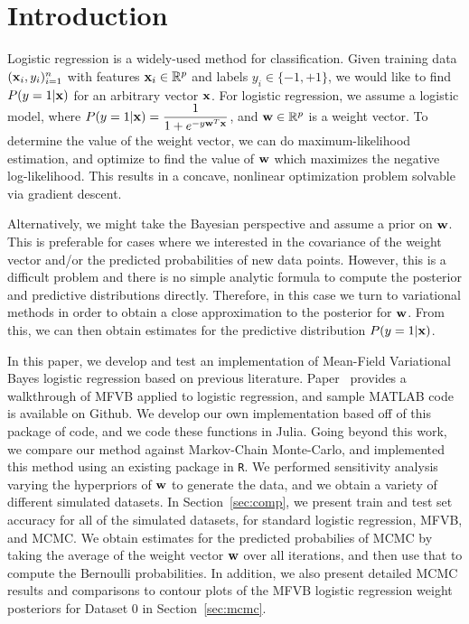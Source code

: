 
\section{Introduction}\label{sec:intro}

Logistic regression is a widely-used method for classification.  Given training data $(\boldsymbol{\mathbf{x}}_i, y_i)_{i=1}^n$ with features $\boldsymbol{\mathbf{x}}_i \in \mathbb{R}^p$ and labels $y_i \in \{-1,+1\}$, we would like to find $P(y = 1 | \boldsymbol{\mathbf{x}})$ for an arbitrary vector $\boldsymbol{\mathbf{x}}$.  For logistic regression, we assume a logistic model, where $P(y = 1 | \boldsymbol{\mathbf{x}}) = \dfrac{1}{1 + e^{-y\boldsymbol{\mathbf{w}}^T\boldsymbol{\mathbf{x}}}}$, and $\boldsymbol{\mathbf{w}} \in \mathbb{R}^p$ is a weight vector.  To determine the value of the weight vector, we can do maximum-likelihood estimation, and optimize to find the value of $\boldsymbol{\mathbf{w}}$ which maximizes the negative log-likelihood.  This results in a concave, nonlinear optimization problem solvable via gradient descent.

Alternatively, we might take the Bayesian perspective and assume a prior on $\boldsymbol{\mathbf{w}}$.  This is preferable for cases where we interested in the covariance of the weight vector and/or the predicted probabilities of new data points.   However, this is a difficult problem and there is no simple analytic formula to compute the posterior and predictive distributions directly.  Therefore, in this case we turn to variational methods in order to obtain a close approximation to the posterior for $\boldsymbol{\mathbf{w}}$.  From this, we can then obtain estimates for the predictive distribution $P(y = 1 | \boldsymbol{\mathbf{x}})$.  

In this paper, we develop and test an implementation of Mean-Field Variational Bayes logistic regression based on previous literature.  Paper~\cite{drugowitsch2013variational} provides a walkthrough of MFVB applied to logistic regression, and sample MATLAB code is available on Github.  We develop our own implementation based off of this package of code, and we code these functions in Julia. Going beyond this work, we compare our method against Markov-Chain Monte-Carlo, and implemented this method using an existing package in \texttt{R}.  We performed sensitivity analysis varying the hyperpriors of $\boldsymbol{\mathbf{w}}$ to generate the data, and we obtain a variety of different simulated datasets.  In Section~\ref{sec:comp}, we present train and test set accuracy for all of the simulated datasets, for standard logistic regression, MFVB, and MCMC.  We obtain estimates for the predicted probabilies of MCMC by taking the average of the weight vector $\boldsymbol{\mathbf{w}}$ over all iterations, and then use that to compute the Bernoulli probabilities.  In addition, we also present detailed MCMC results and comparisons to contour plots of the MFVB logistic regression weight posteriors for Dataset 0 in Section~\ref{sec:mcmc}.   